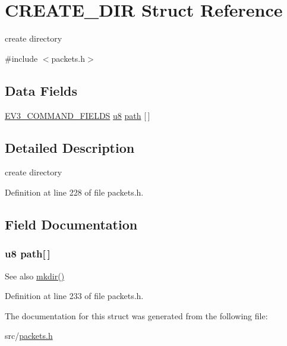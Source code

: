 \hypertarget{struct_c_r_e_a_t_e___d_i_r}{}\section{C\+R\+E\+A\+T\+E\+\_\+\+D\+I\+R Struct Reference}
\label{struct_c_r_e_a_t_e___d_i_r}


create directory  




{\ttfamily \#include $<$packets.\+h$>$}

\subsection*{Data Fields}
\begin{DoxyCompactItemize}
\item 
\hyperlink{packets_8h_a0c26a010ef0da2962a751796943824c9}{E\+V3\+\_\+\+C\+O\+M\+M\+A\+N\+D\+\_\+\+F\+I\+E\+L\+D\+S} \hyperlink{defs_8h_a92c50087ca0e64fa93fc59402c55f8ca}{u8} \hyperlink{struct_c_r_e_a_t_e___d_i_r_a56e505ffa12d1226ba348960c4678d7f}{path} \mbox{[}$\,$\mbox{]}
\end{DoxyCompactItemize}


\subsection{Detailed Description}
create directory 

Definition at line 228 of file packets.\+h.



\subsection{Field Documentation}
\hypertarget{struct_c_r_e_a_t_e___d_i_r_a56e505ffa12d1226ba348960c4678d7f}{}
\subsubsection[{path}]{ {\bf u8} path\mbox{[}$\,$\mbox{]}}\label{struct_c_r_e_a_t_e___d_i_r_a56e505ffa12d1226ba348960c4678d7f}
\begin{DoxySeeAlso}{See also}
\hyperlink{funcs_8h_a433be27a0f3e031bf4b8aca1c53284cb}{mkdir()} 
\end{DoxySeeAlso}


Definition at line 233 of file packets.\+h.



The documentation for this struct was generated from the following file\+:\begin{DoxyCompactItemize}
\item 
src/\hyperlink{packets_8h}{packets.\+h}\end{DoxyCompactItemize}
